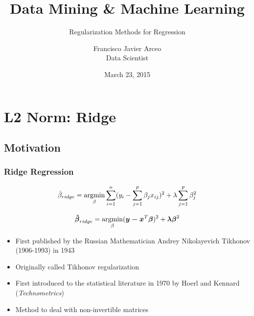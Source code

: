 \documentclass[]{beamer}
\newcommand{\argmin}{\operatornamewithlimits{argmin}}
\begin{document}
\title{Data Mining \& Machine Learning}  
\subtitle{Regularization Methods for Regression}
\author{Francisco Javier Arceo \texorpdfstring{\\ 
        Data Scientist}{} }
\date{March 23, 2015}


\begin{frame}
\titlepage
\end{frame}


\section[Regularization Methods for Regression]{}
\begin{frame}
	\tableofcontents
\end{frame}

\section{L2 Norm: Ridge}
\subsection{Motivation}

\begin{frame}
	\frametitle{Ridge Regression}   %
	\begin{equation}
		\hat{\beta}_{ridge} = \argmin_{\beta} \sum_{i=1}^{n} (y_{i} - \sum_{j=1}^{p}\beta_{j}x_{ij})^2 + \lambda \sum_{j=1}^{p}\beta_{j}^2
	\end{equation}

\begin{equation}
	\boldsymbol{\hat{\beta}}_{ridge} = \argmin_{\beta} (\boldsymbol{y - x}^{T} \boldsymbol{\beta})^2 + \boldsymbol{\lambda \beta}^2
\end{equation}

\begin{itemize}
	\item<1-> First published by the Russian Mathematician Andrey Nikolayevich Tikhonov (1906-1993) in 1943 %
	\item<2-> Originally called Tikhonov regularization %
	\item<3-> First introduced to the statistical literature in 1970 by Hoerl and Kennard (\emph{Technometrics})
	\item<4-> Method to deal with non-invertible  matrices
	\end{itemize}
\end{frame}
                                                   
\end{document}
